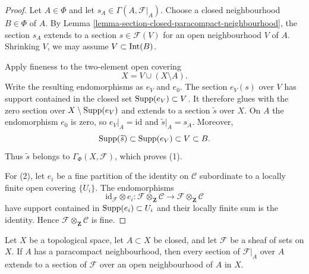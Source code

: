\begin{proof}
Let $A\in\Phi$ and let
$s_A\in\Gamma(A,\mathcal F|_A)$. Choose a closed neighbourhood
$B\in\Phi$ of $A$. By
Lemma \ref{lemma-section-closed-paracompact-neighbourhood}, the section
$s_A$ extends to a section $s\in\mathcal F(V)$ for an open neighbourhood
$V$ of $A$. Shrinking $V$, we may assume $V\subset\mathop{\rm Int}(B)$.

Apply fineness to the two-element open covering
$$
X=V\cup(X\setminus A).
$$
Write the resulting endomorphisms as $e_V$ and $e_0$. The section
$e_V(s)$ over $V$ has support contained in the closed set
$\mathop{\rm Supp}(e_V)\subset V$. It therefore glues with the zero
section over $X\setminus\mathop{\rm Supp}(e_V)$ and extends to a section
$\widetilde s$ over $X$. On $A$ the endomorphism $e_0$ is zero, so
$e_V|_A=\mathrm{id}$ and $\widetilde s|_A=s_A$. Moreover,
$$
\mathop{\rm Supp}(\widetilde s)
\subset\mathop{\rm Supp}(e_V)\subset V\subset B.
$$
Thus $\widetilde s$ belongs to $\Gamma_\Phi(X,\mathcal F)$, which proves
(1).

For (2), let $e_i$ be a fine partition of the identity on $\mathcal C$
subordinate to a locally finite open covering $\{U_i\}$. The
endomorphisms
$$
\mathrm{id}_{\mathcal F}\otimes e_i:
\mathcal F\otimes_{\mathbf Z}\mathcal C
\longrightarrow
\mathcal F\otimes_{\mathbf Z}\mathcal C
$$
have support contained in $\mathop{\rm Supp}(e_i)\subset U_i$ and their
locally finite sum is the identity. Hence
$\mathcal F\otimes_{\mathbf Z}\mathcal C$ is fine.
\end{proof}

\begin{lemma}
\label{lemma-section-closed-paracompact-neighbourhood}
\begin{reference}
\cite[Chapter III, \S 3.3, p. 159]{Tohoku}
\end{reference}
Let $X$ be a topological space, let $A \subset X$ be closed, and let
$\mathcal{F}$ be a sheaf of sets on $X$. If $A$ has a paracompact
neighbourhood, then every section of $\mathcal{F}|_A$ over $A$ extends
to a section of $\mathcal{F}$ over an open neighbourhood of $A$ in $X$.
\end{lemma}

